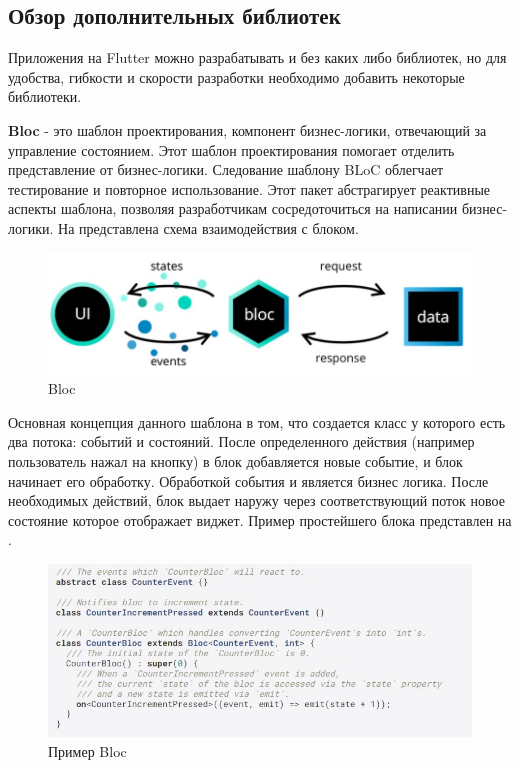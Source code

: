\subsection{Обзор дополнительных библиотек} \label{ch2:subsec22} 

Приложения на Flutter можно разрабатывать и без каких либо библиотек, но для удобства, гибкости и скорости разработки необходимо добавить некоторые библиотеки.

\textbf{Bloc}\cite{bloc} - это шаблон проектирования, компонент бизнес-логики, отвечающий за управление состоянием. Этот шаблон проектирования помогает отделить представление от бизнес-логики. Следование шаблону BLoC облегчает тестирование и повторное использование. Этот пакет абстрагирует реактивные аспекты шаблона, позволяя разработчикам сосредоточиться на написании бизнес-логики. На  представлена схема взаимодействия с блоком.

\begin{figure}[ht!] 
	\center
	\includegraphics [scale=0.6] {my_folder/images//bloc_pattern}
	\caption{Bloc} 
	\label{fig:bloc}  
\end{figure}

Основная концепция данного шаблона в том, что создается класс у которого есть два потока: событий и состояний. После определенного действия (например пользователь нажал на кнопку) в блок добавляется новые событие, и блок начинает его обработку. Обработкой события и является бизнес логика. После необходимых действий, блок выдает наружу через соответствующий поток новое состояние которое отображает виджет. Пример простейшего блока представлен на .

\begin{figure}[ht!] 
	\center
	\includegraphics [scale=0.6] {my_folder/images//bloc_example}
	\caption{Пример Bloc} 
	\label{fig:bloc-example}  
\end{figure}

